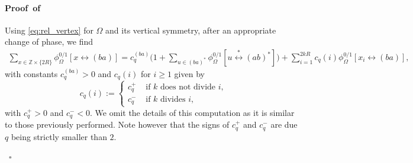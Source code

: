 \documentclass[a4paper,oneside,11pt]{article}
\numberwithin{equation}{section}
\numberwithin{equation}{section}
\numberwithin{equation}{section}
\newenvironment{proof}[1][\relax]%
  {\paragraph{Proof\ifx#1\relax\else~of #1\fi}}%
  {~\hfill$\square$\par\bigskip}
\newcommand{\bbZ}{\mathbb{Z}}
\newcommand{\im}[1]{{\textcolor{blue}{[IM: #1\marginpar{\textcolor{blue}{\bf $\bigstar$}}]}}}
\begin{document}
\begin{proof}
Using \eqref{eq:rel_vertex} for $\Omega$ and its vertical symmetry, after an appropriate change of phase, we find 
\begin{align*}
	\sum_{x\in\bbZ\times\{2R\}}\phi_{\Omega}^{0/1}[x\longleftrightarrow (ba)]
	=c_q^{(ba)}\Big(1+\!\!\!\sum_{u\in (ba)^*}\phi_{\Omega}^{0/1}[u\stackrel{*}\longleftrightarrow (ab)^*]\Big)
	+\sum_{i=1}^{2kR}c_q(i)\phi_{\Omega}^{0/1}[x_i\longleftrightarrow (ba)],
\end{align*}
with constants $c_q^{(ba)} >0$ and $c_q(i)$ for $i \geq 1$ given by 
\begin{equation}
    c_q(i):=\begin{cases}
	    c_q^+&\text{ if }k\text{ does not divide }i,\\
    	c_q^-&\text{ if }k\text{ divides }i,
	    \end{cases}
\end{equation}
with $c_q^+>0$ and $c_q^-<0$.
We omit the details of this computation as it is similar to those previously performed. Note however that the signs of $c_q^+$ and $c_q^-$ are due $q$ being strictly smaller than $2$. 

\end{proof}
\end{document}
